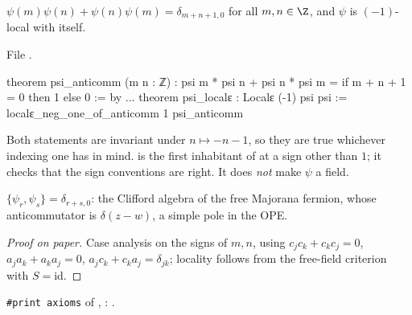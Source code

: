 \begin{theorem}\label{l17:thm:psicar}
$\psi(m)\psi(n)+\psi(n)\psi(m)=\delta_{m+n+1,0}$ for all $m,n\in\Z$, and $\psi$ is $(-1)$-local with
itself.
\end{theorem}
\noindent File .
\begin{leancode}
theorem psi_anticomm (m n : ℤ) :
    psi m * psi n + psi n * psi m = if m + n + 1 = 0 then 1 else 0 := by
...
theorem psi_localε : Localε (-1) psi psi :=
  localε_neg_one_of_anticomm 1 psi_anticomm
\end{leancode}
\begin{dictionary}
Both statements are invariant under $n\mapsto-n-1$, so they are true whichever indexing one has in
mind.  is the first inhabitant of  at a sign other than $1$; it checks
that the sign conventions are right. It does \emph{not} make $\psi$ a field.
\end{dictionary}
\begin{physics}
$\{\psi_r,\psi_s\}=\delta_{r+s,0}$: the Clifford algebra of the free Majorana fermion, whose
anticommutator is $\delta(z-w)$, a simple pole in the OPE.
\end{physics}
\begin{proof}[Proof on paper]
Case analysis on the signs of $m,n$, using $c_jc_k+c_kc_j=0$, $a_ja_k+a_ka_j=0$, $a_jc_k+c_ka_j=\delta_{jk}$;
locality follows from the free-field criterion with $S=\mathrm{id}$.
\end{proof}
\begin{status}
\texttt{\#print axioms} of , :
.
\end{status}


